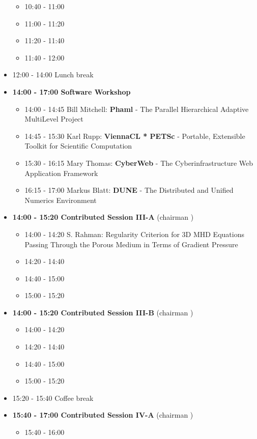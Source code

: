 \documentclass[10pt, A4]{article}%
\begin{document}
\begin{itemize}
  \begin{itemize}
    \item 10:40 - 11:00
    \item 11:00 - 11:20 
    \item 11:20 - 11:40 
    \item 11:40 - 12:00 
  \end{itemize}
  \item 12:00 - 14:00 Lunch break
  \item {\bf 14:00 - 17:00 Software Workshop}
  \begin{itemize}
    \item 14:00 - 14:45 Bill Mitchell: {\bf Phaml} - The Parallel Hierarchical Adaptive MultiLevel Project
    \item 14:45 - 15:30 Karl Rupp: {\bf ViennaCL * PETSc} - Portable, Extensible Toolkit for
Scientific Computation
    \item 15:30 - 16:15 Mary Thomas: {\bf CyberWeb} - The Cyberinfrastructure Web Application Framework
    \item 16:15 - 17:00 Markus Blatt: {\bf DUNE} - The Distributed and Unified Numerics Environment
  \end{itemize}
  \item {\bf 14:00 - 15:20 Contributed Session III-A} (chairman ) 
  \begin{itemize}
    \item 14:00 - 14:20 {S. Rahman}: {Regularity Criterion for 3D MHD Equations Passing Through the Porous Medium in Terms of Gradient Pressure}
    \item 14:20 - 14:40 
    \item 14:40 - 15:00
    \item 15:00 - 15:20  
  \end{itemize}
  \item {\bf 14:00 - 15:20 Contributed Session III-B} (chairman ) 
  \begin{itemize}
    \item 14:00 - 14:20 
    \item 14:20 - 14:40 
    \item 14:40 - 15:00
    \item 15:00 - 15:20  
  \end{itemize}
  \item 15:20 - 15:40 Coffee break
  \item {\bf 15:40 - 17:00 Contributed Session IV-A} (chairman ) 
  \begin{itemize}
    \item 15:40 - 16:00

\end{itemize}
\end{itemize}
\end{document}
